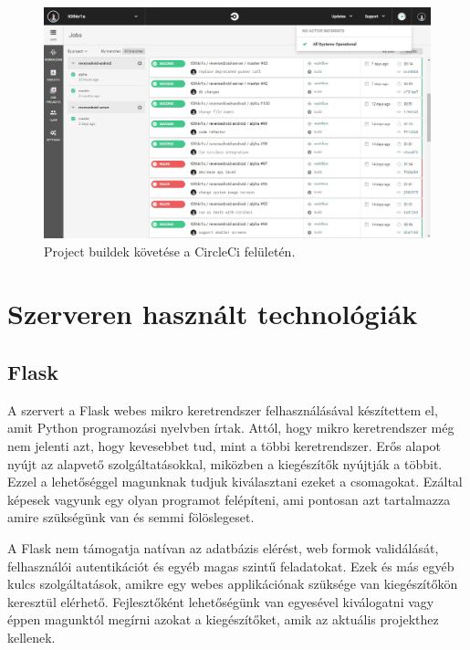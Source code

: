 \documentclass{thesis-ekf}
\theoremstyle{definition}
\theoremstyle{remark}
\begin{document}
\begin{figure}[!h]
	\centering
	\includegraphics[width=15cm]{pictures/circleci}
	\caption{Project buildek követése a CircleCi felületén.}
	\label{circleci}
\end{figure}

\newpage

\section{Szerveren használt technológiák}\label{szerveren_hasznalt_technologiak}

\subsection{Flask}

A szervert a Flask webes mikro keretrendszer felhasználásával készítettem el, amit Python programozási nyelvben írtak.
Attól, hogy mikro keretrendszer még nem jelenti azt, hogy kevesebbet tud, mint a többi keretrendszer.
Erős alapot nyújt az alapvető szolgáltatásokkal, miközben a kiegészítők nyújtják a többit.
Ezzel a lehetőséggel magunknak tudjuk kiválasztani ezeket a csomagokat.
Ezáltal képesek vagyunk egy olyan programot felépíteni, ami pontosan azt tartalmazza amire szükségünk van és semmi fölöslegeset.

A Flask nem támogatja natívan az adatbázis elérést, web formok validálását, felhasználói autentikációt és egyéb magas szintű feladatokat.
Ezek és más egyéb kulcs szolgáltatások, amikre egy webes applikációnak szüksége van kiegészítőkön keresztül elérhető.
Fejlesztőként lehetőségünk van egyesével kiválogatni vagy éppen magunktól megírni azokat a kiegészítőket, amik az aktuális projekthez kellenek.
\cite{flask}
\end{document}
